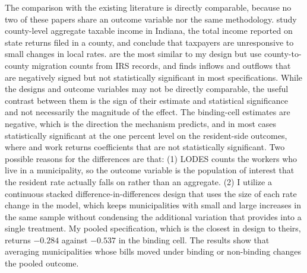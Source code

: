 \documentclass[12pt]{article}
\begin{document}
The comparison with the existing literature is directly comparable, because
no two of these papers share an outcome variable nor the same methodology.
\citet{yangRESPONSIVENESSINCOMELOCAL2017} study county-level aggregate
taxable income in Indiana, the total income reported on state returns filed
in a county, and conclude that taxpayers are unresponsive to small changes
in local rates. %
\citet{yushkovLocalIncomeTaxes2025} are the most similar to my design but use county-to-county
migration counts from IRS records, and finds inflows and outflows that are
negatively signed but not statistically significant in most specifications.
While the designs and outcome variables may not be directly comparable, the useful contrast between them is the sign of their estimate and statistical significance and not necessarily the magnitude of the effect. The binding-cell estimates are negative, which is the direction
the mechanism predicts, and in most cases statistically significant at the one percent level on the
resident-side outcomes, where \citet{yushkovLocalIncomeTaxes2025} and \citet{yangRESPONSIVENESSINCOMELOCAL2017} work returns coefficients that are not statistically significant. Two possible reasons for the differences are that: (1) LODES counts the workers who live in a municipality, so the
outcome variable is the population of interest that the resident rate actually falls on rather than
an aggregate. (2) I utilize a
continuous stacked difference-in-differences design that uses the size of each rate
change in the model, which keeps municipalities with small and large increases in the same sample without condensing the additional variation that provides into a single treatment. My pooled specification, which is
the closest in design to theirs, returns $-0.284$ against $-0.537$ in the
binding cell. The results show that averaging municipalities whose bills moved under binding or non-binding changes the pooled outcome.
\end{document}
